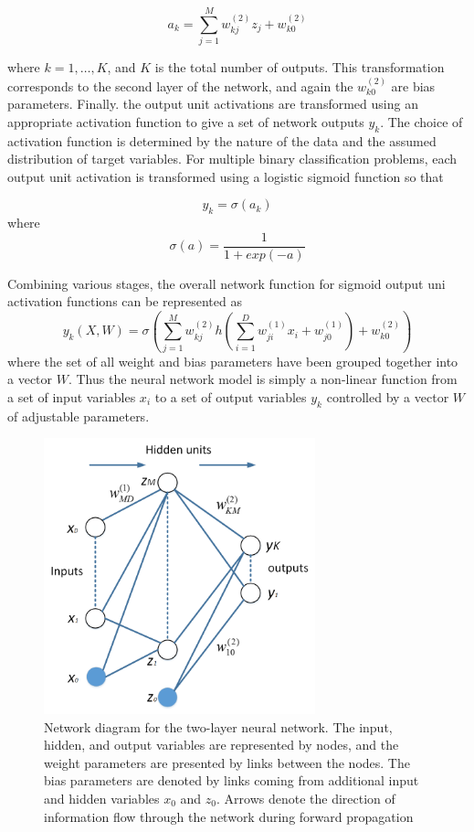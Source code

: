 \begin{equation}
a_{k}=\sum_{j=1}^{M}w_{kj}^{(2)}z_{j}+w_{k0}^{(2)}
\end{equation}


where $k = 1,\ldots ,K$, and $K$ is the total number of outputs. This transformation corresponds to the second layer of the network, and again the $w_{k0}^{(2)}$ are bias parameters. Finally. the output unit activations are transformed using an appropriate activation function to give a set of network outputs $y_{k}$. The choice of activation function is determined by the nature of the data and the assumed distribution of target variables. For multiple binary classification problems, each output unit activation is transformed using a logistic sigmoid function so that

\begin{equation}
y_{k}= \sigma(a_{k})
\end{equation}
where
\begin{equation}
\sigma(a)=\frac{1}{1+exp(-a)}
\end{equation}

Combining various stages, the overall network function for sigmoid output uni activation functions can be represented as
\begin{equation}
y_{k}(X,W)=\sigma(\sum_{j=1}^{M}w_{kj}^{(2)}h(\sum_{i=1}^{D}w_{ji}^{(1)}x_{i}+w_{j0}^{(1)})+w_{k0}^{(2)})
\end{equation}
where the set of all weight and bias parameters have been grouped together into a vector $W$. Thus the neural network model is simply a non-linear function from a set of input variables ${x_{i}}$ to a set of output variables $y_{k}$ controlled by a vector $W$ of adjustable parameters.


\begin{figure}[htb!]
\centering
\includegraphics[width=0.7\textwidth]{image/Method/ANN.png}
\caption[An ANN classifier]{Network diagram for the two-layer neural network. The input, hidden, and output variables are represented by nodes, and the weight parameters are presented by links between the nodes. The bias parameters are denoted by links coming from additional input and hidden variables $x_{0}$ and $z_{0}$. Arrows denote the direction of information flow through the network during forward propagation}
\label{fig:ANN}
\end{figure}


